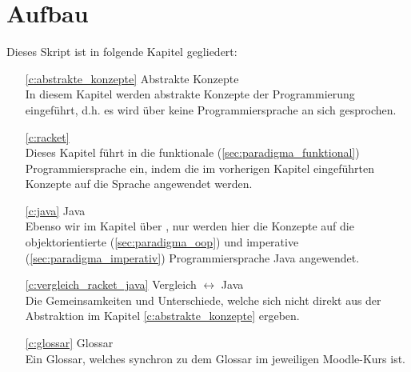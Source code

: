 
\section{Aufbau}
	Dieses Skript ist in folgende Kapitel gegliedert:
	\begin{itemize}
		\item[\ref{c:abstrakte_konzepte}] Abstrakte Konzepte \\ In diesem Kapitel werden abstrakte Konzepte der Programmierung eingeführt, d.h. es wird über keine Programmiersprache an sich gesprochen.
		\item[\ref{c:racket}] \racket \\ Dieses Kapitel führt in die funktionale (\ref{sec:paradigma_funktional}) Programmiersprache \racket ein, indem die im vorherigen Kapitel eingeführten Konzepte auf die Sprache angewendet werden.
		\item[\ref{c:java}] Java \\ Ebenso wir im Kapitel über \racket, nur werden hier die Konzepte auf die objektorientierte (\ref{sec:paradigma_oop}) und imperative (\ref{sec:paradigma_imperativ}) Programmiersprache Java angewendet.
		\item[\ref{c:vergleich_racket_java}] Vergleich \racket $ \leftrightarrow $ Java \\ Die Gemeinsamkeiten und Unterschiede, welche sich nicht direkt aus der Abstraktion im Kapitel \ref{c:abstrakte_konzepte} ergeben.
		\item[\ref{c:glossar}] Glossar \\ Ein Glossar, welches synchron zu dem Glossar im jeweiligen Moodle-Kurs ist.
	\end{itemize}
